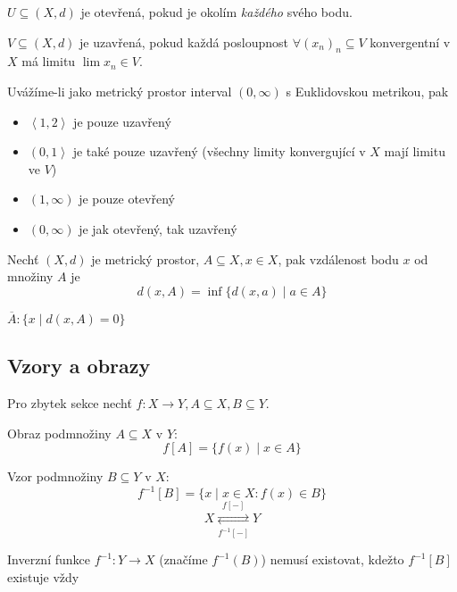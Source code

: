 \documentclass[../main.tex]{subfiles}
\begin{document}
\begin{definition}
	$U \subseteq (X,d)$ je otevřená, pokud je okolím \textit{každého} svého bodu.
\end{definition}

\begin{definition}
	$V \subseteq (X,d)$ je uzavřená, pokud každá posloupnost $\forall (x_n)_n \subseteq V$ konvergentní v $X$ má limitu $\lim x_n \in V$.
\end{definition}

\begin{example}
	Uvážíme-li jako metrický prostor interval \(\left(0, \infty\right)\) s Euklidovskou metrikou, pak
\begin{itemize}
	\item \(\left<1, 2\right>\) je pouze uzavřený
	\item \(\left(0, 1\right>\) je také pouze uzavřený (všechny limity konvergující v \(X\) mají limitu ve \(V\))
	\item \(\left(1, \infty\right)\) je pouze otevřený
	\item \(\left(0, \infty\right)\) je jak otevřený, tak uzavřený
\end{itemize}
\end{example}

\begin{definition}
	Nechť $(X,d)$ je metrický prostor, $A \subseteq X, x\in X$, pak vzdálenost bodu $x$ od množiny $A$ je
	\[d(x,A) = \inf\{d(x,a)\mid a \in A\}\]
\end{definition}

\begin{definition}[Uzávěr]
	$\overline{A} : \{x \mid d(x,A) = 0\}$
\end{definition}

\subsection{Vzory a obrazy}
Pro zbytek sekce nechť $f: X \rightarrow Y, A \subseteq X, B \subseteq Y$.

\begin{definition}[Obraz]
	Obraz podmnožiny $A\subseteq X$ v $Y$:
	\[f[A] = \{f(x) \mid x \in A\}\]
\end{definition}

\begin{definition}[Vzor]
	Vzor podmnožiny $B\subseteq Y$ v $X$:
	\[f^{-1}[B] = \{x \mid x \in X: f(x) \in B\}\]
	\[X \underset{f^{-1}[-]}{\stackrel{f[-]}{\rightleftarrows}} Y\]

	Inverzní funkce $f^{-1}:Y \rightarrow X$ (značíme \(f^{-1}(B)\)) nemusí existovat, kdežto $f^{-1}[B]$ existuje vždy
\end{definition}
\end{document}
